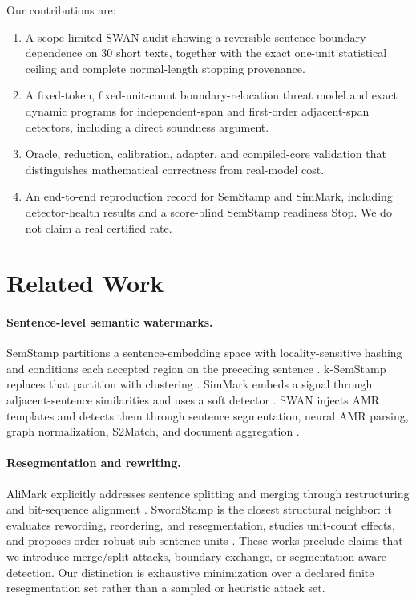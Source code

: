\documentclass[10pt]{article}
\begin{document}
Our contributions are:

\begin{enumerate}
  \item A scope-limited SWAN audit showing a reversible sentence-boundary
  dependence on 30 short texts, together with the exact one-unit statistical
  ceiling and complete normal-length stopping provenance.
  \item A fixed-token, fixed-unit-count boundary-relocation threat model and
  exact dynamic programs for independent-span and first-order adjacent-span
  detectors, including a direct soundness argument.
  \item Oracle, reduction, calibration, adapter, and compiled-core validation
  that distinguishes mathematical correctness from real-model cost.
  \item An end-to-end reproduction record for SemStamp and SimMark, including
  detector-health results and a score-blind SemStamp readiness Stop. We do
  not claim a real certified rate.
\end{enumerate}

\section{Related Work}

\paragraph{Sentence-level semantic watermarks.}
SemStamp partitions a sentence-embedding space with locality-sensitive
hashing and conditions each accepted region on the preceding sentence
\citep{hou2024semstamp}. k-SemStamp replaces that partition with clustering
\citep{hou2024ksemstamp}. SimMark embeds a signal through adjacent-sentence
similarities and uses a soft detector \citep{dabiriaghdam2025simmark}. SWAN
injects AMR templates and detects them through sentence segmentation, neural
AMR parsing, graph normalization, S2Match, and document aggregation
\citep{ye2026swan}.

\paragraph{Resegmentation and rewriting.}
AliMark explicitly addresses sentence splitting and merging through
restructuring and bit-sequence alignment \citep{li2026alimark}. SwordStamp is
the closest structural neighbor: it evaluates rewording, reordering, and
resegmentation, studies unit-count effects, and proposes order-robust
sub-sentence units \citep{diaa2026swordstamp}. These works preclude claims
that we introduce merge/split attacks, boundary exchange, or
segmentation-aware detection. Our distinction is exhaustive minimization over
a declared finite resegmentation set rather than a sampled or heuristic
attack set.
\end{document}
